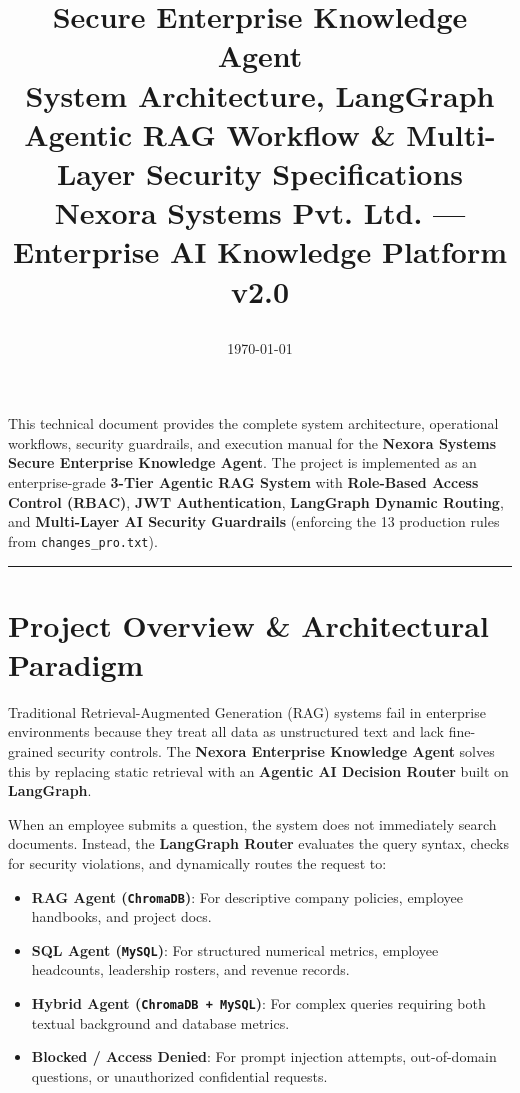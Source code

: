 \documentclass[11pt,a4paper]{article}
\title{
    \vspace{-1.5cm}
    \begin{flushleft}
        {\Huge \bfseries \color{NexoraDark} Secure Enterprise Knowledge Agent} \\ [0.4cm]
        {\Large \bfseries \color{NexoraBlue} System Architecture, LangGraph Agentic RAG Workflow \& Multi-Layer Security Specifications} \\ [0.6cm]
        {\normalsize \color{gray} Nexora Systems Pvt. Ltd. — Enterprise AI Knowledge Platform v2.0}
    \end{flushleft}
}
\author{}
\date{\today}
\begin{document}
\maketitle
\thispagestyle{empty}
\vspace{-1cm}

\begin{infobox}
This technical document provides the complete system architecture, operational workflows, security guardrails, and execution manual for the \textbf{Nexora Systems Secure Enterprise Knowledge Agent}. The project is implemented as an enterprise-grade \textbf{3-Tier Agentic RAG System} with \textbf{Role-Based Access Control (RBAC)}, \textbf{JWT Authentication}, \textbf{LangGraph Dynamic Routing}, and \textbf{Multi-Layer AI Security Guardrails} (enforcing the 13 production rules from \texttt{changes\_pro.txt}).
\end{infobox}

\tableofcontents
\vspace{0.5cm}
\hrule
\vspace{0.5cm}

\section{Project Overview \& Architectural Paradigm}

Traditional Retrieval-Augmented Generation (RAG) systems fail in enterprise environments because they treat all data as unstructured text and lack fine-grained security controls. The \textbf{Nexora Enterprise Knowledge Agent} solves this by replacing static retrieval with an \textbf{Agentic AI Decision Router} built on \textbf{LangGraph}.

When an employee submits a question, the system does not immediately search documents. Instead, the \textbf{LangGraph Router} evaluates the query syntax, checks for security violations, and dynamically routes the request to:
\begin{itemize}[noitemsep]
    \item \textbf{RAG Agent (\texttt{ChromaDB})}: For descriptive company policies, employee handbooks, and project docs.
    \item \textbf{SQL Agent (\texttt{MySQL})}: For structured numerical metrics, employee headcounts, leadership rosters, and revenue records.
    \item \textbf{Hybrid Agent (\texttt{ChromaDB + MySQL})}: For complex queries requiring both textual background and database metrics.
    \item \textbf{Blocked / Access Denied}: For prompt injection attempts, out-of-domain questions, or unauthorized confidential requests.
\end{itemize}
\end{document}
